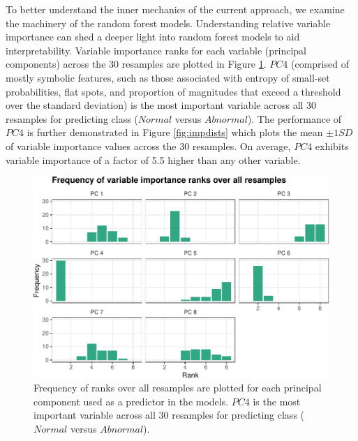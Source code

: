 \documentclass{article}
\begin{document}
To better understand the inner mechanics of the current approach, we examine the machinery of the random forest models. Understanding relative variable importance can shed a deeper light into random forest models to aid interpretability. Variable importance ranks for each variable (principal components) across the 30 resamples are plotted in Figure \ref{fig:impranks}. \(PC 4\) (comprised of mostly symbolic features, such as those associated with entropy of small-set probabilities, flat spots, and proportion of magnitudes that exceed a threshold over the standard deviation) is the most important variable across all 30 resamples for predicting class (\(Normal\) versus \(Abnormal\)). The performance of \(PC 4\) is further demonstrated in Figure \ref{fig:impdists} which plots the mean \(\pm1SD\) of variable importance values across the 30 resamples. On average, \(PC 4\) exhibits variable importance of a factor of 5.5 higher than any other variable.

\begin{figure}
\centering
\includegraphics{olet5610_report_files/figure-latex/impranks-1.pdf}
\caption{\label{fig:impranks}Frequency of ranks over all resamples are plotted for each principal component used as a predictor in the models. \(PC 4\) is the most important variable across all 30 resamples for predicting class (\(Normal\) versus \(Abnormal\)).}
\end{figure}
\end{document}
